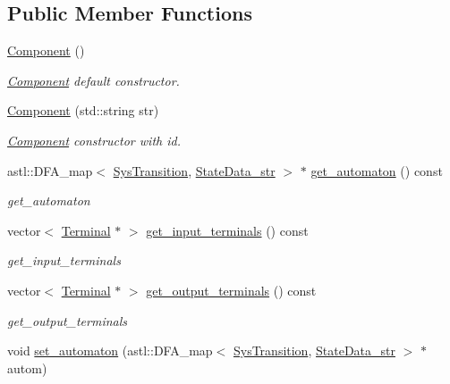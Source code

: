 \subsection*{Public Member Functions}
\begin{DoxyCompactItemize}
\item 
\hyperlink{class_component_a8775db6d1a2c1afc2e77cd3c8f39da6f}{Component} ()\hypertarget{class_component_a8775db6d1a2c1afc2e77cd3c8f39da6f}{}\label{class_component_a8775db6d1a2c1afc2e77cd3c8f39da6f}

\begin{DoxyCompactList}\small\item\em \hyperlink{class_component}{Component} default constructor. \end{DoxyCompactList}\item 
\hyperlink{class_component_a5c645611542c6f3af559645f699b2806}{Component} (std\+::string str)
\begin{DoxyCompactList}\small\item\em \hyperlink{class_component}{Component} constructor with id. \end{DoxyCompactList}\item 
astl\+::\+D\+F\+A\+\_\+map$<$ \hyperlink{class_sys_transition}{Sys\+Transition}, \hyperlink{class_state_data__str}{State\+Data\+\_\+str} $>$ $\ast$ \hyperlink{class_component_a05d5dfb1fb2fd6f434e58fa286d4b993}{get\+\_\+automaton} () const 
\begin{DoxyCompactList}\small\item\em get\+\_\+automaton \end{DoxyCompactList}\item 
vector$<$ \hyperlink{class_terminal}{Terminal} $\ast$ $>$ \hyperlink{class_component_a812ded651f64b6cbc476ac28cae2fab2}{get\+\_\+input\+\_\+terminals} () const 
\begin{DoxyCompactList}\small\item\em get\+\_\+input\+\_\+terminals \end{DoxyCompactList}\item 
vector$<$ \hyperlink{class_terminal}{Terminal} $\ast$ $>$ \hyperlink{class_component_ae1e4892775ca02ee2a4b727d56edf3a4}{get\+\_\+output\+\_\+terminals} () const 
\begin{DoxyCompactList}\small\item\em get\+\_\+output\+\_\+terminals \end{DoxyCompactList}\item 
void \hyperlink{class_component_a97c16a49225019a6a2b082c006822f8e}{set\+\_\+automaton} (astl\+::\+D\+F\+A\+\_\+map$<$ \hyperlink{class_sys_transition}{Sys\+Transition}, \hyperlink{class_state_data__str}{State\+Data\+\_\+str} $>$ $\ast$autom)

\end{DoxyCompactItemize}
